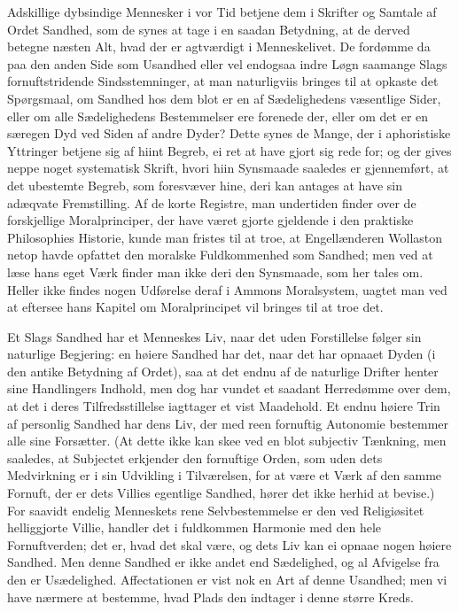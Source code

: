 \documentclass[12pt]{article}
\newcommand{\opage}[1]{\marginnote{\footnotesize\textit{[#1]}}}
\begin{document}
Adskillige dybsindige Mennesker i vor Tid betjene dem i Skrifter og Samtale af Ordet Sandhed, som de synes at tage i en saadan Betydning, at de derved betegne næsten Alt, hvad der er agtværdigt i Menneskelivet. De fordømme da paa den anden Side som Usandhed eller vel endogsaa indre Løgn saamange Slags fornuftstridende Sindsstemninger, at man naturligviis bringes til at opkaste det Spørgsmaal, om Sandhed hos \opage{165}dem blot er en af Sædelighedens væsentlige Sider, eller om alle Sædelighedens Bestemmelser ere forenede der, eller om det er en særegen Dyd ved Siden af andre Dyder? Dette synes de Mange, der i aphoristiske Yttringer betjene sig af hiint Begreb, ei ret at have gjort sig rede for; og der gives neppe noget systematisk Skrift, hvori hiin Synsmaade saaledes er gjennemført, at det ubestemte Begreb, som foresvæver hine, deri kan antages at have sin adæqvate Fremstilling. Af de korte Registre, man undertiden finder over de forskjellige Moralprinciper, der have været gjorte gjeldende i den praktiske Philosophies Historie, kunde man fristes til at troe, at Engellænderen Wollaston netop havde opfattet den moralske Fuldkommenhed som Sandhed; men ved at læse hans eget Værk finder man ikke deri den Synsmaade, som her tales om. Heller ikke findes nogen Udførelse deraf i Ammons Moralsystem, uagtet man ved at eftersee hans Kapitel om Moralprincipet vil bringes til at troe det.

Et Slags Sandhed har et Menneskes Liv, naar det uden Forstillelse følger sin naturlige Begjering: en høiere Sandhed har det, naar det har opnaaet Dyden (i den antike Betydning af Ordet), saa at det endnu af de naturlige Drifter henter sine Handlingers Indhold, men dog har vundet et saadant Herredømme over dem, at det i deres Tilfredsstillelse iagttager et vist Maadehold. Et endnu høiere Trin af personlig Sandhed har dens Liv, der med reen fornuftig Autonomie bestemmer alle sine Forsætter. (At dette ikke kan skee ved en blot subjectiv Tænkning, men saaledes, at Subjectet erkjender den fornuftige Orden, som uden dets Medvirkning er i sin Udvikling i Tilværelsen, for at være et Værk af den samme Fornuft, der er dets Villies egentlige Sandhed, hører det ikke herhid at bevise.) For saavidt endelig Menneskets rene Selvbestemmelse er den ved Religiøsitet helliggjorte Villie, handler det i fuldkommen Harmonie med den hele Fornuftverden; det er, hvad det skal være, og dets Liv kan \opage{166}ei opnaae nogen høiere Sandhed. Men denne Sandhed er ikke andet end Sædelighed, og al Afvigelse fra den er Usædelighed. Affectationen er vist nok en Art af denne Usandhed; men vi have nærmere at bestemme, hvad Plads den indtager i denne større Kreds.
\end{document}
